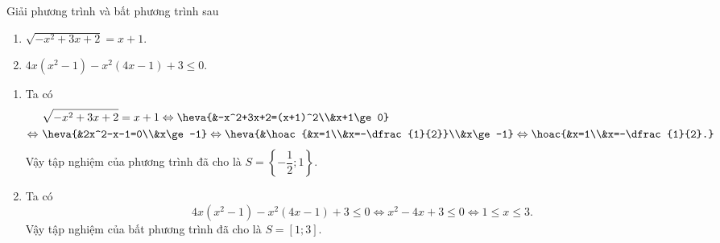 \begin{bt}%
Giải phương trình và bất phương trình sau
\begin{enumerate}
\item[a)] $\sqrt{-x^2+3x+2}=x+1$.
\item[b)] $4x(x^2-1)-x^2(4x-1)+3\le0$.
\end{enumerate}
\loigiai
{
\begin{enumerate}
\item Ta có
\[\begin{aligned}
& \ \sqrt{-x^2+3x+2}=x+1\Leftrightarrow\heva{&-x^2+3x+2=(x+1)^2\\&x+1\ge0} \\
\Leftrightarrow & \ \heva{&2x^2-x-1=0\\&x\ge-1}\Leftrightarrow\heva{&\hoac{&x=1\\&x=-\dfrac{1}{2}}\\&x\ge-1} \Leftrightarrow \hoac{&x=1\\&x=-\dfrac{1}{2}.}
\end{aligned}\]
Vậy tập nghiệm của phương trình đã cho là $S=\left\{-\dfrac{1}{2};1\right\}$.
\item Ta có
\[4x(x^2-1)-x^2(4x-1)+3\le0\Leftrightarrow x^2-4x+3\le0\Leftrightarrow 1\le x\le3.\]
Vậy tập nghiệm của bất phương trình đã cho là $S=[1;3]$.
\end{enumerate}
}
\end{bt}

